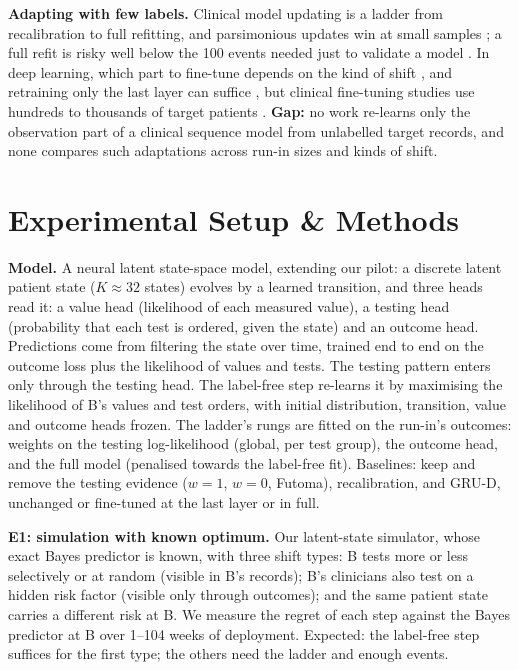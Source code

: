 \documentclass{article}
\theoremstyle{plain}
\theoremstyle{definition}
\theoremstyle{remark}
\begin{document}
\textbf{Adapting with few labels.} Clinical model updating is a ladder from recalibration to full refitting, and parsimonious updates win at small samples \citep{steyerberg2004,vergouwe2017}; a full refit is risky well below the 100 events needed just to validate a model \citep{riley2024}. In deep learning, which part to fine-tune depends on the kind of shift \citep{lee2023}, and retraining only the last layer can suffice \citep{kirichenko2023}, but clinical fine-tuning studies use hundreds to thousands of target patients \citep{moor2023,yaib2024}. \textbf{Gap:} no work re-learns only the observation part of a clinical sequence model from unlabelled target records, and none compares such adaptations across run-in sizes and kinds of shift.

\section{Experimental Setup \& Methods}

\textbf{Model.} A neural latent state-space model, extending our pilot: a discrete latent patient state ($K{\approx}32$ states) evolves by a learned transition, and three heads read it: a value head (likelihood of each measured value), a testing head (probability that each test is ordered, given the state) and an outcome head. Predictions come from filtering the state over time, trained end to end on the outcome loss plus the likelihood of values and tests. The testing pattern enters only through the testing head. The label-free step re-learns it by maximising the likelihood of B's values and test orders, with initial distribution, transition, value and outcome heads frozen. The ladder's rungs are fitted on the run-in's outcomes: weights on the testing log-likelihood (global, per test group), the outcome head, and the full model (penalised towards the label-free fit). Baselines: keep and remove the testing evidence ($w{=}1$, $w{=}0$, Futoma), recalibration, and GRU-D, unchanged or fine-tuned at the last layer or in full.

\textbf{E1: simulation with known optimum.} Our latent-state simulator, whose exact Bayes predictor is known, with three shift types: B tests more or less selectively or at random (visible in B's records); B's clinicians also test on a hidden risk factor (visible only through outcomes); and the same patient state carries a different risk at B. We measure the regret of each step against the Bayes predictor at B over 1--104 weeks of deployment. Expected: the label-free step suffices for the first type; the others need the ladder and enough events.
\end{document}
